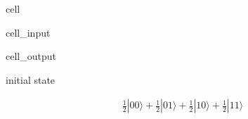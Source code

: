 \documentclass[letterpaper,10pt,english]{jupyterBook}
\begin{document}
\begin{sphinxuseclass}{cell}\begin{sphinxVerbatimInput}

\begin{sphinxuseclass}{cell_input}
\begin{sphinxVerbatim}[commandchars=\\\{\}]
   
   
   

  

\PYG{p}{[}\PYG{p}{]}

\end{sphinxVerbatim}

\end{sphinxuseclass}\end{sphinxVerbatimInput}
\begin{sphinxVerbatimOutput}

\begin{sphinxuseclass}{cell_output}
\begin{sphinxVerbatim}[commandchars=\\\{\}]
initial state
\end{sphinxVerbatim}
\begin{equation*}
\begin{split}\frac{1}{2} |00\rangle+\frac{1}{2} |01\rangle+\frac{1}{2} |10\rangle+\frac{1}{2} |11\rangle\end{split}
\end{equation*}
\end{sphinxuseclass}\end{sphinxVerbatimOutput}

\end{sphinxuseclass}
\end{document}

